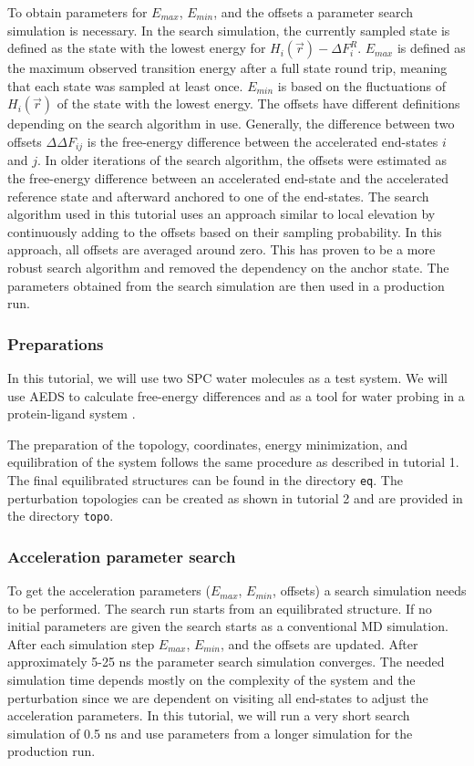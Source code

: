 To obtain parameters for $E_{max}$, $E_{min}$, and the offsets a parameter search simulation is necessary. In the search simulation, the currently sampled state is defined as the state with the lowest energy for $H_i(\vec{r}) - \Delta F_{i}^R$. $E_{max}$ is defined as the maximum observed transition energy after a full state round trip, meaning that each state was sampled at least once. $E_{min}$ is based on the fluctuations of $H_i(\vec{r})$ of the state with the lowest energy. The offsets have different definitions depending on the search algorithm in use. Generally, the difference between two offsets $\Delta\Delta F_{ij}$ is the free-energy difference between the accelerated end-states $i$ and $j$. In older iterations of the search algorithm, the offsets were estimated as the free-energy difference between an accelerated end-state and the accelerated reference state and afterward anchored to one of the end-states. The search algorithm used in this tutorial uses an approach similar to local elevation by continuously adding to the offsets based on their sampling probability. In this approach, all offsets are averaged around zero. This has proven to be a more robust search algorithm and removed the dependency on the anchor state. The parameters obtained from the search simulation are then used in a production run.

\subsubsection{Preparations}
In this tutorial, we will use two SPC water molecules as a test system. We will use AEDS to calculate free-energy differences and as a tool for water probing in a protein-ligand system \cite{gracia1}.   
 
The preparation of the topology, coordinates, energy minimization, and equilibration of the system follows the same procedure as described in tutorial 1.
The final equilibrated structures can be found in the directory \texttt{eq}. The perturbation topologies can be created as shown in tutorial 2 and are provided in the directory \texttt{topo}.

\subsubsection{Acceleration parameter search}
To get the acceleration parameters ($E_{max}$, $E_{min}$, offsets) a search simulation needs to be performed. The search run starts from an equilibrated structure. If no initial parameters are given the search starts as a conventional MD simulation. After each simulation step $E_{max}$, $E_{min}$, and the offsets are updated. After approximately 5-25 ns the parameter search simulation converges. The needed simulation time depends mostly on the complexity of the system and the perturbation since we are dependent on visiting all end-states to adjust the acceleration parameters. In this tutorial, we will run a very short search simulation of 0.5 ns and use parameters from a longer simulation for the production run.  

